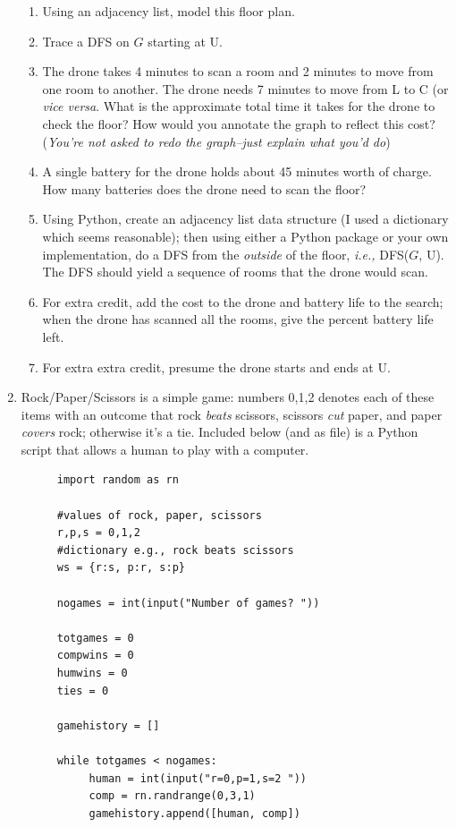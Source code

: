 \documentclass{article}
\begin{document}
\begin{enumerate}
\begin{enumerate}
\item Using an adjacency list, model this floor plan.
\item Trace a DFS on $G$ starting at \textsf{U}.
\item The drone takes 4 minutes to scan a room and 2 minutes to move from one room to another.  The drone needs 7 minutes to move from \textsf{L} to \textsf{C} (or {\it vice versa}.  What is the approximate total time it takes for the drone to check the floor?  How would you annotate the graph to reflect this cost? ({\it You're not asked to redo the graph--just explain what you'd do})
\item A single battery for the drone holds about 45 minutes worth of charge.  How many batteries does the drone need to scan the floor?
\item Using Python, create an adjacency list data structure (I used a dictionary which seems reasonable); then using either a Python package or your own implementation, do a DFS from the {\it outside} of the floor, {\it i.e.,} DFS($G$, \textsf{U}).  The DFS should yield a sequence of rooms that the drone would scan.
\item For extra credit, add the cost to the drone and battery life to the search; when the drone has scanned all the rooms, give the percent battery life left. 
\item For extra extra credit, presume the drone starts and ends at \textsf{U}.
\end{enumerate}
\item Rock/Paper/Scissors is a simple game: numbers 0,1,2 denotes each of these items with an outcome that rock {\it beats} scissors, scissors {\it cut} paper, and paper {\it covers} rock; otherwise it's a tie.  Included below (and as file) is a Python script that allows a human to play with a computer. 
\begin{figure}[h]
{\small
\begin{verbatim}
import random as rn

#values of rock, paper, scissors
r,p,s = 0,1,2
#dictionary e.g., rock beats scissors
ws = {r:s, p:r, s:p}

nogames = int(input("Number of games? "))

totgames = 0
compwins = 0
humwins = 0
ties = 0

gamehistory = []

while totgames < nogames:
     human = int(input("r=0,p=1,s=2 "))
     comp = rn.randrange(0,3,1)
     gamehistory.append([human, comp])


\end{verbatim}}
\end{figure}
\end{enumerate}
\end{document}
